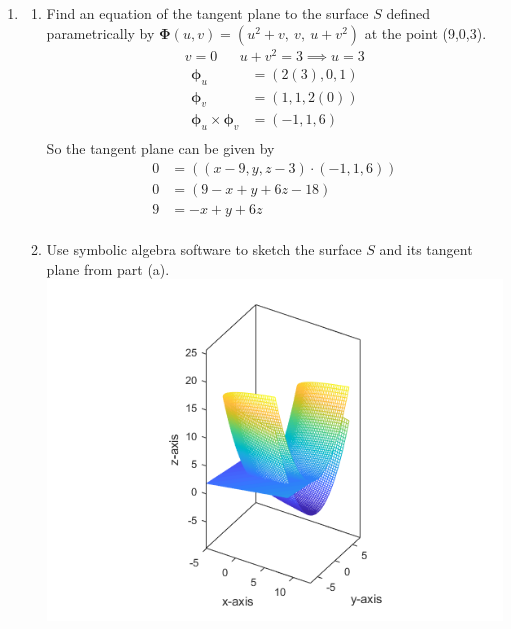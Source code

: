 \documentclass{article}
\begin{document}
\thispagestyle{fancy}

\begin{enumerate}
    \item
    \begin{enumerate}
        \item Find an equation of the tangent plane to the surface $S$ defined parametrically by $\boldsymbol \Phi(u, v) = (u^2 + v,\ v,\ u+v^2)$ at the point (9,0,3).
        \begin{align*}
            &v = 0 & &u + v^2 = 3 \implies u = 3&
        \end{align*}
        \begin{align*}
            \boldsymbol \phi_u &= (2(3), 0, 1) \\
            \boldsymbol \phi_v &= (1,1,2(0)) \\
            \boldsymbol \phi_u \times \boldsymbol \phi_v &= (-1,1,6) \\
        \end{align*}
        So the tangent plane can be given by
        \begin{align*}
            0 &= ((x - 9, y, z - 3) \cdot (-1,1,6)) \\
            0 &= (9 - x + y + 6z - 18) \\
            9 &= -x + y + 6z \\
        \end{align*}
        \item Use symbolic algebra software to sketch the surface $S$ and its tangent plane from part (a).
        \includegraphics[width=\textwidth]{b42-a7-1b}
    \end{enumerate}


\end{enumerate}
\end{document}
